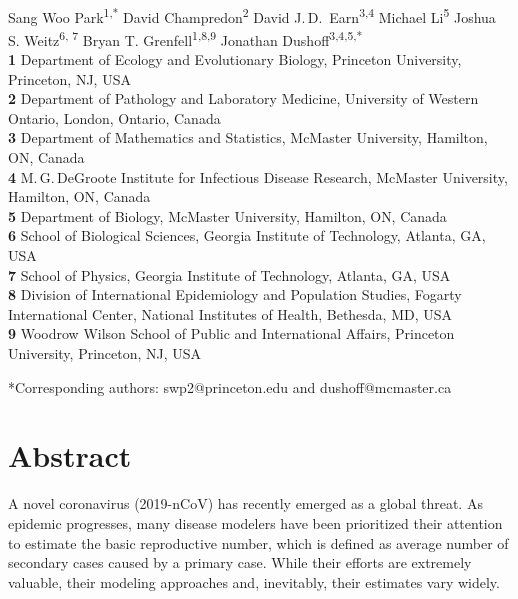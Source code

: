 \documentclass[12pt]{article}
\date{\today}
\begin{document}
\begin{flushleft}{
	\Large
	\textbf{}
}
\newline
\\
Sang Woo Park\textsuperscript{1,*}
David Champredon\textsuperscript{2}
David J.\,D.\ Earn\textsuperscript{3,4}
Michael Li\textsuperscript{5}
Joshua S. Weitz\textsuperscript{6, 7}
Bryan T. Grenfell\textsuperscript{1,8,9}
Jonathan Dushoff\textsuperscript{3,4,5,*}
\\
\bigskip
\textbf{1} Department of Ecology and Evolutionary Biology, Princeton University, Princeton, NJ, USA
\\
\textbf{2} Department of Pathology and Laboratory Medicine, University of Western Ontario, London, Ontario, Canada
\\
\textbf{3} Department of Mathematics and Statistics, McMaster University, Hamilton, ON, Canada
\\
\textbf{4} M.\,G.\,DeGroote Institute for Infectious Disease Research, McMaster University, Hamilton, ON, Canada
\\
\textbf{5} Department of Biology, McMaster University, Hamilton, ON, Canada
\\
\textbf{6} School of Biological Sciences, Georgia Institute of Technology, Atlanta, GA, USA
\\
\textbf{7} School of Physics, Georgia Institute of Technology, Atlanta, GA, USA
\\
\textbf{8} Division of International Epidemiology and Population Studies, Fogarty International Center, National Institutes of Health, Bethesda, MD, USA
\\
\textbf{9} Woodrow Wilson School of Public and International Affairs, Princeton University, Princeton, NJ, USA
\\
\bigskip

*Corresponding authors: swp2@princeton.edu and dushoff@mcmaster.ca
\end{flushleft}

\section*{Abstract}
A novel coronavirus (2019-nCoV) has recently emerged as a global threat. 
As epidemic progresses, many disease modelers have been prioritized their attention to estimate the basic reproductive number, which is defined as average number of secondary cases caused by a primary case.
While their efforts are extremely valuable, their modeling approaches and, inevitably, their estimates vary widely.
\end{document}

